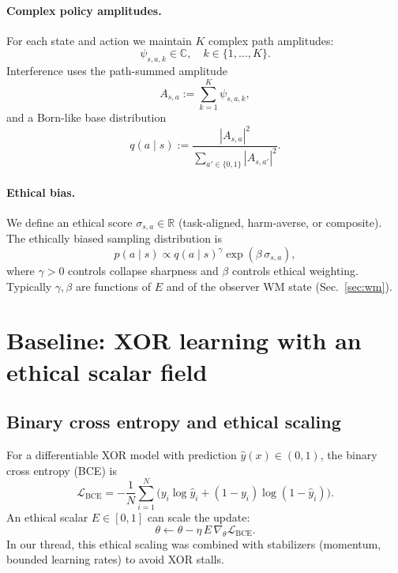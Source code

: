 \documentclass[11pt]{article}
\begin{document}
\paragraph{Complex policy amplitudes.}
For each state and action we maintain $K$ complex path amplitudes:
\begin{equation}
\psi_{s,a,k}\in\mathbb{C},\quad k\in\{1,\dots,K\}.
\end{equation}
Interference uses the path-summed amplitude
\begin{equation}
A_{s,a} := \sum_{k=1}^K \psi_{s,a,k},
\end{equation}
and a Born-like base distribution
\begin{equation}
q(a\mid s) := \frac{|A_{s,a}|^2}{\sum_{a'\in\{0,1\}} |A_{s,a'}|^2}.
\end{equation}

\paragraph{Ethical bias.}
We define an ethical score $\sigma_{s,a}\in\mathbb{R}$ (task-aligned, harm-averse, or composite). The ethically biased sampling distribution is
\begin{equation}
p(a\mid s) \propto q(a\mid s)^{\gamma} \exp(\beta\, \sigma_{s,a}),
\label{eq:ethical-born}
\end{equation}
where $\gamma>0$ controls collapse sharpness and $\beta$ controls ethical weighting. Typically $\gamma,\beta$ are functions of $E$ and of the observer WM state (Sec.~\ref{sec:wm}).

\section{Baseline: XOR learning with an ethical scalar field}
\subsection{Binary cross entropy and ethical scaling}
For a differentiable XOR model with prediction $\hat y(x)\in(0,1)$, the binary cross entropy (BCE) is
\begin{equation}
\mathcal{L}_{\mathrm{BCE}} = -\frac{1}{N}\sum_{i=1}^N \Big(y_i\log \hat y_i + (1-y_i)\log(1-\hat y_i)\Big).
\end{equation}
An ethical scalar $E\in[0,1]$ can scale the update:
\begin{equation}
\theta \leftarrow \theta - \eta \, E \, \nabla_\theta \mathcal{L}_{\mathrm{BCE}}.
\end{equation}
In our thread, this ethical scaling was combined with stabilizers (momentum, bounded learning rates) to avoid XOR stalls.
\end{document}
